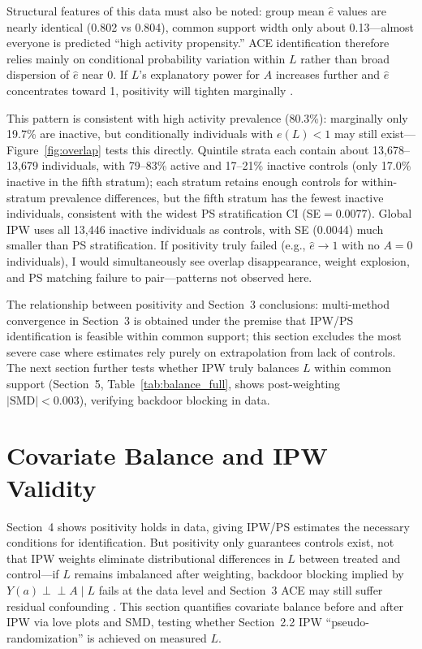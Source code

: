 \documentclass[12pt,a4paper]{article}
\newcommand{\indep}{\perp\!\!\!\perp}
\begin{document}
Structural features of this data must also be noted: group mean $\hat e$ values are nearly identical (0.802 vs 0.804), common support width only about 0.13---almost everyone is predicted ``high activity propensity.'' ACE identification therefore relies mainly on conditional probability variation within $L$ rather than broad dispersion of $\hat e$ near 0. If $L$'s explanatory power for $A$ increases further and $\hat e$ concentrates toward 1, positivity will tighten marginally \cite{chen2024iptw}.

This pattern is consistent with high activity prevalence (80.3\%): marginally only 19.7\% are inactive, but conditionally individuals with $e(L)<1$ may still exist---Figure~\ref{fig:overlap} tests this directly. Quintile strata each contain about 13{,}678--13{,}679 individuals, with 79--83\% active and 17--21\% inactive controls (only 17.0\% inactive in the fifth stratum); each stratum retains enough controls for within-stratum prevalence differences, but the fifth stratum has the fewest inactive individuals, consistent with the widest PS stratification CI (SE$=0.0077$). Global IPW uses all 13{,}446 inactive individuals as controls, with SE (0.0044) much smaller than PS stratification. If positivity truly failed (e.g., $\hat e\to 1$ with no $A=0$ individuals), I would simultaneously see overlap disappearance, weight explosion, and PS matching failure to pair---patterns not observed here.

The relationship between positivity and Section~3 conclusions: multi-method convergence in Section~3 is obtained under the premise that IPW/PS identification is feasible within common support; this section excludes the most severe case where estimates rely purely on extrapolation from lack of controls. The next section further tests whether IPW truly balances $L$ within common support (Section~5, Table~\ref{tab:balance_full}, shows post-weighting $|\mathrm{SMD}|<0.003$), verifying backdoor blocking in data.

\section{Covariate Balance and IPW Validity}

Section~4 shows positivity holds in data, giving IPW/PS estimates the necessary conditions for identification. But positivity only guarantees controls exist, not that IPW weights eliminate distributional differences in $L$ between treated and control---if $L$ remains imbalanced after weighting, backdoor blocking implied by $Y(a)\indep A\mid L$ fails at the data level and Section~3 ACE may still suffer residual confounding \cite{rosenbaum1983central,chen2024iptw}. This section quantifies covariate balance before and after IPW via love plots and SMD, testing whether Section~2.2 IPW ``pseudo-randomization'' is achieved on measured $L$.
\end{document}
